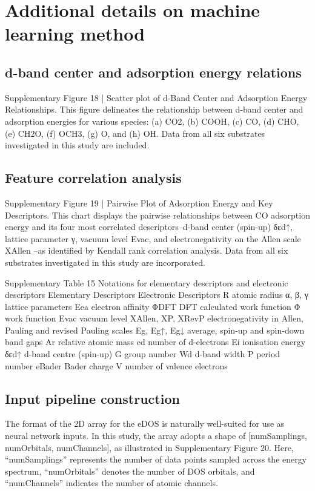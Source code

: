 

\section{Additional details on machine learning method}

\subsection{d-band center and adsorption energy relations}


Supplementary Figure 18 | Scatter plot of d-Band Center and Adsorption Energy Relationships. This figure delineates the relationship between d-band center and adsorption energies for various species: (a) CO2, (b) COOH, (c) CO, (d) CHO, (e) CH2O, (f) OCH3, (g) O, and (h) OH. Data from all six substrates investigated in this study are included.


\subsection{Feature correlation analysis}


Supplementary Figure 19 | Pairwise Plot of Adsorption Energy and Key Descriptors. This chart displays the pairwise relationships between CO adsorption energy and its four most correlated descriptors–d-band center (spin-up) δεd↑, lattice parameter γ, vacuum level Evac, and electronegativity on the Allen scale XAllen –as identified by Kendall rank correlation analysis. Data from all six substrates investigated in this study are incorporated.


Supplementary Table 15
Notations for elementary descriptors and electronic descriptors
Elementary Descriptors	Electronic Descriptors
R	atomic radius	α, β, γ	lattice parameters
Eea	electron affinity	ΦDFT	DFT calculated work function
Φ	work function	Evac	vacuum level
XAllen, ΧP, ΧRevP	electronegativity in Allen, Pauling and revised Pauling scales	Eg, Eg↑, Eg↓	average, spin-up and spin-down band gaps
Ar	relative atomic mass	ed	number of d-electrons
Ei	ionisation energy	δεd↑	d-band centre (spin-up)
G	group number	Wd	d-band width
P	period number	eBader	Bader charge
V	number of valence electrons


\subsection{Input pipeline construction}
The format of the 2D array for the eDOS is naturally well-suited for use as neural network inputs. In this study, the array adopts a shape of [numSamplings, numOrbitals, numChannels], as illustrated in Supplementary Figure 20. Here, “numSamplings” represents the number of data points sampled across the energy spectrum, “numOrbitals” denotes the number of DOS orbitals, and “numChannels” indicates the number of atomic channels.


